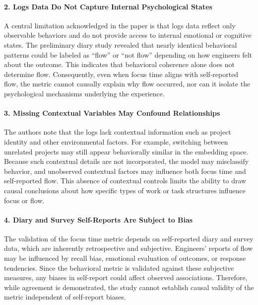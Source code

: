 \paragraph{2. Logs Data Do Not Capture Internal Psychological States}

A central limitation acknowledged in the paper is that logs data reflect only observable behaviors and do not provide access to internal emotional or cognitive states. The preliminary diary study revealed that nearly identical behavioral patterns could be labeled as “flow” or “not flow” depending on how engineers felt about the outcome. This indicates that behavioral coherence alone does not determine flow. Consequently, even when focus time aligns with self-reported flow, the metric cannot causally explain why flow occurred, nor can it isolate the psychological mechanisms underlying the experience.

\paragraph{3. Missing Contextual Variables May Confound Relationships}

The authors note that the logs lack contextual information such as project identity and other environmental factors. For example, switching between unrelated projects may still appear behaviorally similar in the embedding space. Because such contextual details are not incorporated, the model may misclassify behavior, and unobserved contextual factors may influence both focus time and self-reported flow. This absence of contextual controls limits the ability to draw causal conclusions about how specific types of work or task structures influence focus or flow.

\paragraph{4. Diary and Survey Self-Reports Are Subject to Bias}

The validation of the focus time metric depends on self-reported diary and survey data, which are inherently retrospective and subjective. Engineers’ reports of flow may be influenced by recall bias, emotional evaluation of outcomes, or response tendencies. Since the behavioral metric is validated against these subjective measures, any biases in self-report could affect observed associations. Therefore, while agreement is demonstrated, the study cannot establish causal validity of the metric independent of self-report biases.



